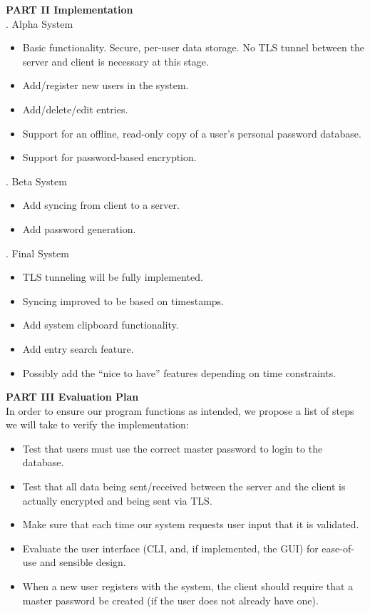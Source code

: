 \documentclass[11pt, letterpaper]{article}
\newcommand{\DesignSection}[1]
{\noindent\textbf{#1}\\}
\begin{document}
\DesignSection{PART II Implementation}
. Alpha System
\begin{itemize} \itemsep1pt \parskip0pt 
    \item Basic functionality. Secure, per-user data storage. No \ac{TLS} tunnel between the server and client is necessary at this stage.
    \item Add/register new users in the system.
    \item Add/delete/edit entries.
    \item Support for an offline, read-only copy of a user’s personal password database.
    \item Support for password-based encryption.
\end{itemize}
. Beta System
\begin{itemize} \itemsep1pt \parskip0pt 
    \item Add syncing from client to a server.
    \item Add password generation.
\end{itemize}
. Final System
\begin{itemize} \itemsep1pt \parskip0pt 
    \item \ac{TLS} tunneling will be fully implemented.
    \item Syncing improved to be based on timestamps.
    \item Add system clipboard functionality.
    \item Add entry search feature.
    \item Possibly add the “nice to have” features depending on time constraints.
\end{itemize}

\DesignSection{PART III Evaluation Plan}
\noindent
In order to ensure our program functions as intended, we propose a list of steps we will take to verify the implementation:
\begin{itemize} \itemsep1pt \parskip0pt 
    \item Test that users must use the correct master password to login to the database.
    \item Test that all data being sent/received between the server and the client is actually encrypted and being sent via \ac{TLS}.
    \item Make sure that each time our system requests user input that it is validated.
    \item Evaluate the user interface (\ac{CLI}, and, if implemented, the \ac{GUI}) for ease-of-use and sensible design.
    \item When a new user registers with the system, the client should require that a master password be created (if the user does not already have one).
\end{itemize}
\end{document}
